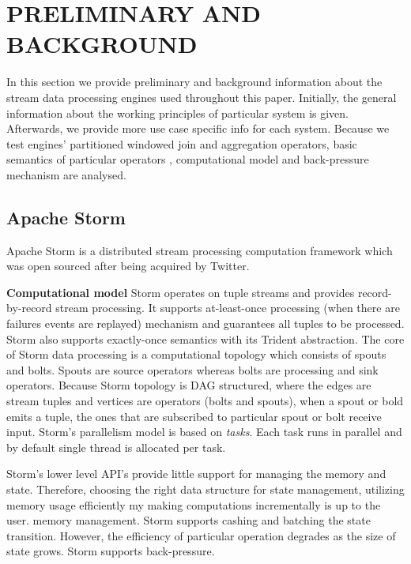 \section{PRELIMINARY AND BACKGROUND}
\label{pre}

In this section we provide preliminary and background information about the stream data processing engines used throughout this paper.  Initially, the general information about the working principles of particular system is given.  Afterwards, we provide more use case specific info for each system. Because we test engines' partitioned windowed join and  aggregation operators, basic semantics of particular operators , computational model and back-pressure mechanism are analysed.  
\subsection{Apache Storm}

Apache Storm is a distributed stream processing computation framework which was open sourced after being acquired by Twitter. 


\textbf{Computational model}
Storm operates on tuple streams and provides record-by-record stream processing. It supports at-least-once processing (when there are failures events are replayed) mechanism and guarantees all tuples to be processed. Storm also supports exactly-once semantics with its Trident abstraction. The core of Storm data processing is a computational topology which consists of spouts and bolts.  Spouts are source operators whereas bolts are processing and sink operators. Because Storm topology is DAG structured, where the edges are stream tuples and vertices are operators (bolts and spouts), when a spout or bold emits a tuple, the ones that are subscribed to particular spout or bolt receive input. Storm's parallelism model is based on \textit{tasks}. Each task runs in parallel and by default single thread is allocated per task. 

Storm's lower level API's provide little support for managing the memory and state. Therefore, choosing the right data structure for state management, utilizing memory usage efficiently my making computations incrementally  is up to the user. 
memory management. Storm supports cashing and batching the state transition. However, the efficiency of particular operation degrades as the size of state grows.  Storm  supports back-pressure.



